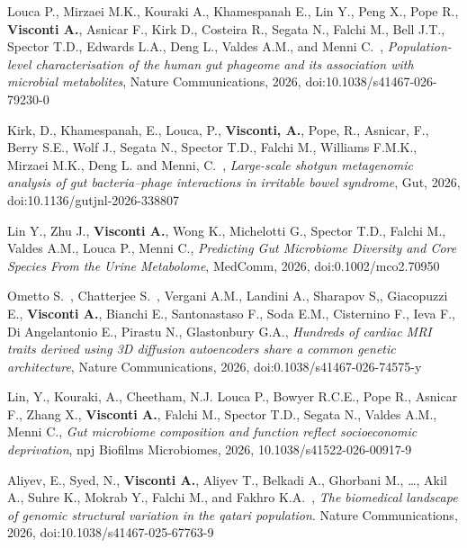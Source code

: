 	\begin{itemize}
		
		 Louca P.\cofirst, Mirzaei M.K.\cofirst, Kouraki A., Khamespanah E., Lin Y., Peng X., Pope R., \textbf{Visconti A.}, Asnicar F., Kirk D., Costeira R., Segata N., Falchi M., Bell J.T., Spector T.D., Edwards L.A., Deng L.\colast, Valdes A.M.\colast, and Menni C.\colast ~\corresponding, \emph{Population-level characterisation of the human gut phageome and its association with microbial metabolites}, Nature Communications, 2026, doi:10.1038/s41467-026-79230-0
		
		  Kirk, D., Khamespanah, E., Louca, P., \textbf{Visconti, A.}, Pope, R., Asnicar, F., Berry S.E., Wolf J., Segata N., Spector T.D., Falchi M., Williams F.M.K., Mirzaei M.K.\colast, Deng L\colast. and Menni, C.\colast ~\corresponding, \emph{Large-scale shotgun metagenomic analysis of gut bacteria–phage interactions in irritable bowel syndrome}, Gut, 2026, doi:10.1136/gutjnl-2026-338807 
		
		  Lin Y., Zhu J., \textbf{Visconti A.}, Wong K., Michelotti G., Spector T.D., Falchi M., Valdes A.M., Louca P., Menni C.\corresponding, \emph{Predicting Gut Microbiome Diversity and Core Species From the Urine Metabolome}, MedComm, 2026, doi:0.1002/mco2.70950
		
		 Ometto S.\cofirst ~\corresponding, Chatterjee S.\cofirst ~\corresponding, Vergani A.M., Landini A., Sharapov S,, Giacopuzzi E., \textbf{Visconti A.},  Bianchi E., Santonastaso F., Soda E.M., Cisternino F.,  Ieva F., Di Angelantonio E.,  Pirastu N., Glastonbury G.A.\corresponding,  \emph{Hundreds of cardiac MRI traits derived using 3D diffusion autoencoders share a common genetic architecture}, Nature Communications, 2026, doi:0.1038/s41467-026-74575-y
				
		 Lin, Y., Kouraki, A., Cheetham, N.J. Louca P., Bowyer R.C.E., Pope R., Asnicar F., Zhang X., \textbf{Visconti A.}, Falchi M., Spector T.D., Segata N., Valdes A.M.\corresponding, Menni C.\corresponding, \emph{Gut microbiome composition and function reflect socioeconomic deprivation}, npj Biofilms Microbiomes, 2026, 10.1038/s41522-026-00917-9 %
		
		 Aliyev, E., Syed, N., \textbf{Visconti A.}, Aliyev T.,  Belkadi A., Ghorbani M., \dots, Akil A., Suhre K.,  Mokrab Y.,  Falchi M.\colast, and Fakhro K.A.\colast ~\corresponding, \emph{The biomedical landscape of genomic structural variation in the qatari population}. Nature Communications, 2026, doi:10.1038/s41467-025-67763-9 %
		

\end{itemize}
